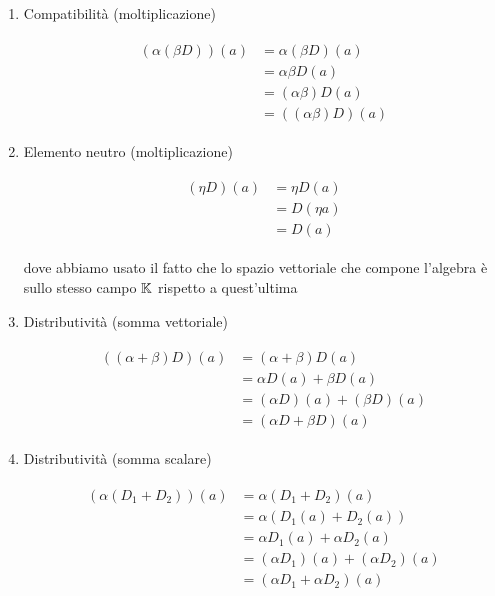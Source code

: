 \begin{enumerate}
	\item Compatibilità (moltiplicazione)
	
	\begin{align}
		\begin{split}
			(\alpha (\beta D)) (a) &= \alpha (\beta D) (a)\\
			&= \alpha \beta D (a)\\
			&= (\alpha \beta) D (a)\\
			&= ((\alpha \beta) D) (a)
		\end{split}
	\end{align}
	
	\item Elemento neutro (moltiplicazione)
	
	\begin{align}
		\begin{split}
			(\eta D) (a) &= \eta D (a)\\
			&= D (\eta a)\\
			&= D (a)
		\end{split}
	\end{align}
	
	dove abbiamo usato il fatto che lo spazio vettoriale che compone l'algebra è sullo stesso campo $ \mathbb{K} $ rispetto a quest'ultima
	
	\item Distributività (somma vettoriale)
	
	\begin{align}
		\begin{split}
			((\alpha + \beta) D) (a) &= (\alpha + \beta) D (a)\\
			&= \alpha D (a) + \beta D (a)\\
			&= (\alpha D) (a) + (\beta D) (a)\\
			&= (\alpha D + \beta D) (a)
		\end{split}
	\end{align}
	
	\item Distributività (somma scalare)
	
	\begin{align}
		\begin{split}
			(\alpha (D_{1} + D_{2})) (a) &= \alpha (D_{1} + D_{2}) (a)\\
			&= \alpha (D_{1} (a) + D_{2} (a))\\
			&= \alpha D_{1} (a) + \alpha D_{2} (a)\\
			&= (\alpha D_{1}) (a) + (\alpha D_{2}) (a)\\
			&= (\alpha D_{1} + \alpha D_{2}) (a)
		\end{split}
	\end{align}
\end{enumerate}

